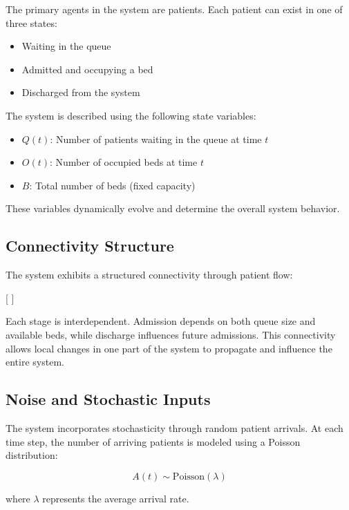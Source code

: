 \documentclass[11pt]{article}
\begin{document}
The primary agents in the system are patients. Each patient can exist in one of three states:
\begin{itemize}
\item Waiting in the queue
\item Admitted and occupying a bed
\item Discharged from the system
\end{itemize}

The system is described using the following state variables:

\begin{itemize}
\item $Q(t)$: Number of patients waiting in the queue at time $t$
\item $O(t)$: Number of occupied beds at time $t$
\item $B$: Total number of beds (fixed capacity)
\end{itemize}

These variables dynamically evolve and determine the overall system behavior.

\subsection{Connectivity Structure}

The system exhibits a structured connectivity through patient flow:

[
 \rightarrow {} \rightarrow {} \rightarrow {}
]

Each stage is interdependent. Admission depends on both queue size and available beds, while discharge influences future admissions. This connectivity allows local changes in one part of the system to propagate and influence the entire system.

\subsection{Noise and Stochastic Inputs}

The system incorporates stochasticity through random patient arrivals. At each time step, the number of arriving patients is modeled using a Poisson distribution:

\begin{equation}
A(t) \sim \text{Poisson}(\lambda)
\end{equation}

where $\lambda$ represents the average arrival rate.
\end{document}
